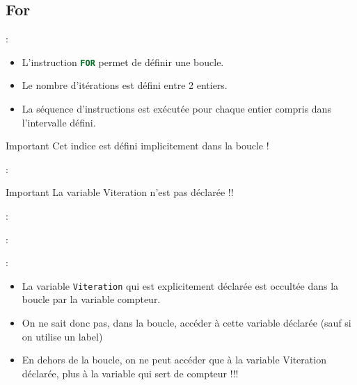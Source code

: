 \documentclass[10pt]{beamer}
\begin{document}
\subsection{For}
\begin{frame}{\secname : \subsecname}
    \begin{itemize}
        \item L'instruction \lstinline[language=sql]!FOR! permet de définir une boucle.
        \item Le nombre d'itérations est défini entre 2 entiers.
        \item La séquence d'instructions est exécutée pour chaque entier compris dans l'intervalle défini.
    \end{itemize}
    \begin{alertblock}{Important}
        Cet indice est défini implicitement dans la boucle !
    \end{alertblock}
\end{frame}

\begin{frame}{\secname : \subsecname}
    
    \begin{alertblock}{Important}
        La variable Viteration n'est pas déclarée !!
    \end{alertblock}
\end{frame}

\begin{frame}{\secname : \subsecname}
    
\end{frame}

\begin{frame}{\secname : \subsecname}
    
\end{frame}

\begin{frame}{\secname : \subsecname}
    \begin{itemize}
        \item La variable \lstinline[language=sql]!Viteration! qui est explicitement déclarée est occultée dans la boucle par la variable compteur.
        \item On ne sait donc pas, dans la boucle, accéder à cette variable déclarée (sauf si on utilise un label)
        \item En dehors de la boucle, on ne peut accéder que à la variable Viteration déclarée, plus à la variable qui sert de compteur !!!
    \end{itemize}
\end{frame}
\end{document}
